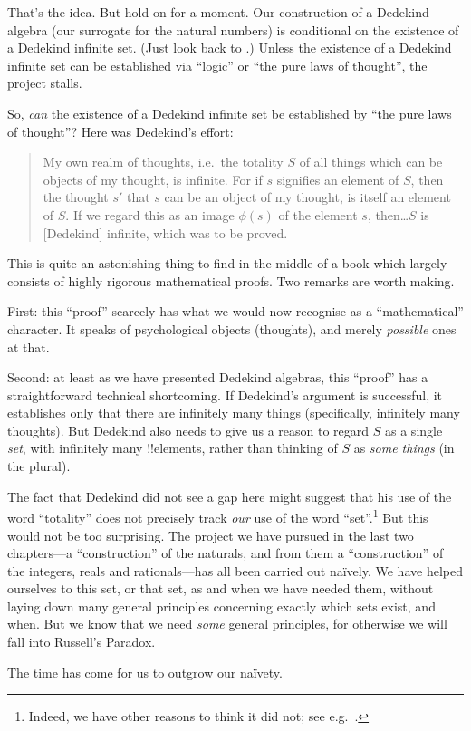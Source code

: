 \documentclass[../../../include/open-logic-section]{subfiles}
\begin{document}
That's the idea. But hold on for a moment. Our construction of a Dedekind algebra (our surrogate for the natural numbers) is conditional on the existence of a Dedekind infinite set. (Just look back to .) Unless the existence of a Dedekind infinite set can be established via ``logic'' or ``the pure laws of thought'', the project stalls. 

So, \emph{can} the existence of a Dedekind infinite set be established by ``the pure laws of thought''? Here was Dedekind's effort:
\begin{quote}
	My own realm of thoughts, i.e.\ the totality $S$ of all things which can be objects of my thought, is infinite. For if $s$ signifies an element of $S$, then the thought $s'$ that $s$ can be an object of my thought, is itself an element of $S$. If we regard this as an image $\phi(s)$ of the element $s$, then\ldots $S$ is [Dedekind] infinite, which was to be proved. \citep[\S66]{Dedekind1888}
\end{quote}
This is quite an astonishing thing to find in the middle of a book which largely consists of highly rigorous mathematical proofs. Two remarks are worth making. 

First: this ``proof'' scarcely has what we would now recognise as a ``mathematical'' character. It speaks of psychological objects (thoughts), and merely \emph{possible} ones at that.

Second: at least as we have presented Dedekind algebras, this ``proof'' has a straightforward technical shortcoming. If Dedekind's argument is successful, it establishes only that there are infinitely many things (specifically, infinitely many thoughts). But Dedekind also needs to give us a reason to regard $S$ as a single \emph{set}, with infinitely many !!{element}s, rather than thinking of $S$ as \emph{some things} (in the plural). 

The fact that Dedekind did not see a gap here might suggest that his use of the word ``totality'' does not precisely track \emph{our} use of the word ``set''.\footnote{Indeed, we have other reasons to think it did not; see e.g.\ \citet[23]{Potter2004}.} But this would not be too surprising. 
The project we have pursued in the last two chapters---a ``construction'' of the naturals, and from them a ``construction'' of the integers, reals and rationals---has all been carried out na\"ively. We have helped ourselves to this set, or that set, as and when we have needed them, without laying down many general principles concerning exactly which sets exist, and when. But we know that we need \emph{some} general principles, for otherwise we will fall into Russell's Paradox.

 The time has come for us to outgrow our na\"ivety. 
\end{document}
